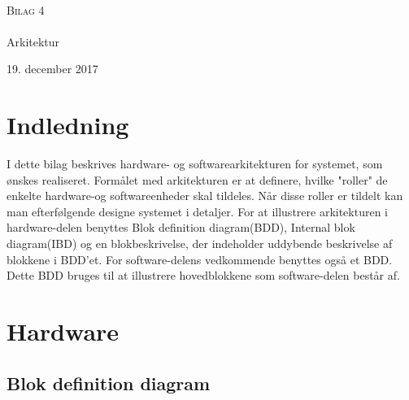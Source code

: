 

\begin{titlingpage}
\begin{center}

~ \\[3cm]


\textsc{\LARGE Bilag 4}\\[1.5cm]


\noindent\makebox[\linewidth]{\rule{\textwidth}{0.4pt}}\\
[0.5cm]{\Huge Arkitektur}
\noindent\makebox[\linewidth]{\rule{\textwidth}{0.4pt}}
\end{center}
\vfill
\begin{center}
{\large 19. december 2017}
\end{center}
\end{titlingpage}

\newpage
\tableofcontents*
\newpage

\chapter{Indledning}

I dette bilag beskrives hardware- og softwarearkitekturen for systemet, som ønskes realiseret. Formålet med arkitekturen er at definere, hvilke "roller"  de enkelte hardware-og softwareenheder skal tildeles. Når disse roller er tildelt kan man efterfølgende designe systemet i detaljer. For at illustrere arkitekturen i hardware-delen benyttes Blok definition diagram(BDD), Internal blok diagram(IBD) og en blokbeskrivelse, der indeholder uddybende beskrivelse af blokkene i BDD'et. For software-delens vedkommende benyttes også et BDD. Dette BDD bruges til at illustrere hovedblokkene som software-delen består af.       





\chapter{Hardware}
\section{Blok definition diagram}

